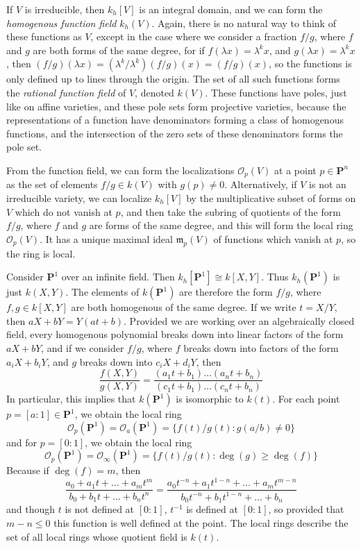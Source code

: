 If $V$ is irreducible, then $k_h[V]$ is an integral domain, and we can form the \emph{homogenous function field} $k_h(V)$. Again, there is no natural way to think of these functions as $V$, except in the case where we consider a fraction $f/g$, where $f$ and $g$ are both forms of the same degree, for if $f(\lambda x) = \lambda^k x$, and $g(\lambda x) = \lambda^k x$, then $(f/g)(\lambda x) = (\lambda^k/\lambda^k) (f/g)(x) = (f/g)(x)$, so the functions is only defined up to lines through the origin. The set of all such functions forms the \emph{rational function field} of $V$, denoted $k(V)$. These functions have poles, just like on affine varieties, and these pole sets form projective varieties, because the representations of a function have denominators forming a class of homogenous functions, and the intersection of the zero sets of these denominators forms the pole set.

From the function field, we can form the localizations $\mathcal{O}_p(V)$ at a point $p \in \mathbf{P}^n$ as the set of elements $f/g \in k(V)$ with $g(p) \neq 0$. Alternatively, if $V$ is not an irreducible variety, we can localize $k_h[V]$ by the multiplicative subset of forms on $V$ which do not vanish at $p$, and then take the subring of quotients of the form $f/g$, where $f$ and $g$ are forms of the same degree, and this will form the local ring $\mathcal{O}_p(V)$. It has a unique maximal ideal $\mathfrak{m}_p(V)$ of functions which vanish at $p$, so the ring is local.

\begin{example}
    Consider $\mathbf{P}^1$ over an infinite field. Then $k_h[\mathbf{P}^1] \cong k[X,Y]$. Thus $k_h(\mathbf{P}^1)$ is just $k(X,Y)$. The elements of $k(\mathbf{P}^1)$ are therefore the form $f/g$, where $f,g \in k[X,Y]$ are both homogenous of the same degree. If we write $t = X/Y$, then $aX + bY = Y(at + b)$. Provided we are working over an algebraically closed field, every homogenous polynomial breaks down into linear factors of the form $aX + bY$, and if we consider $f/g$, where $f$ breaks down into factors of the form $a_iX + b_iY$, and $g$ breaks down into $c_iX + d_iY$, then
    \[ \frac{f(X,Y)}{g(X,Y)} = \frac{(a_1t + b_1) \dots (a_nt + b_n)}{(c_1t + b_1) \dots (c_nt + b_n)} \]
    In particular, this implies that $k(\mathbf{P}^1)$ is isomorphic to $k(t)$. For each point $p = [a:1] \in \mathbf{P}^1$, we obtain the local ring
    \[ \mathcal{O}_p(\mathbf{P}^1) = \mathcal{O}_a(\mathbf{P}^1) = \{ f(t)/g(t) : g(a/b) \neq 0 \} \]
    and for $p = [0:1]$, we obtain the local ring
    \[ \mathcal{O}_p(\mathbf{P}^1) = \mathcal{O}_\infty(\mathbf{P}^1) = \{  f(t)/g(t) : \deg(g) \geq \deg(f) \} \]
    Because if $\deg(f) = m$, then
    \[ \frac{a_0 + a_1t + \dots + a_mt^m}{b_0 + b_1t + \dots + b_nt^n} = \frac{a_0t^{-n} + a_1t^{1-n} + \dots + a_mt^{m-n}}{b_0t^{-n} + b_1t^{1-n} + \dots + b_n} \]
    and though $t$ is not defined at $[0:1]$, $t^{-1}$ is defined at $[0:1]$, so provided that $m-n \leq 0$ this function is well defined at the point. The local rings describe the set of all local rings whose quotient field is $k(t)$.
\end{example}

